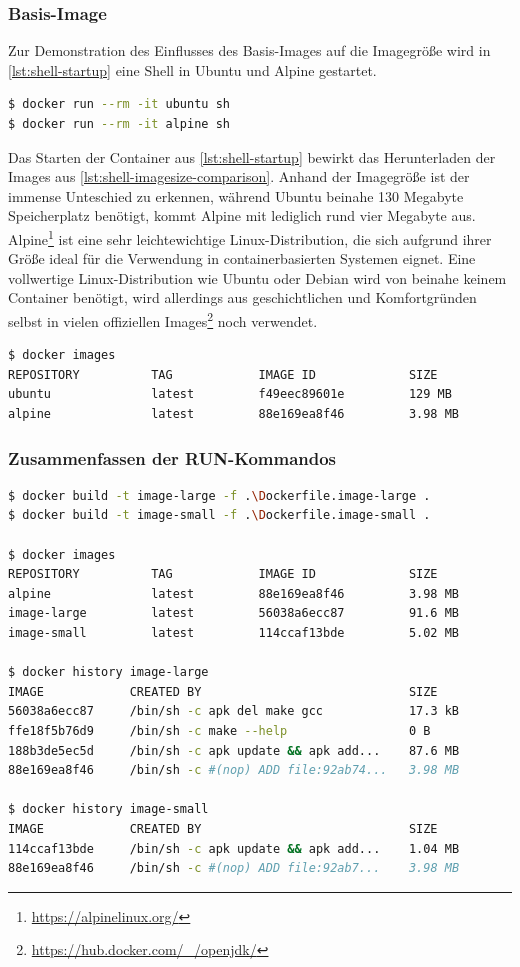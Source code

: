 \subsubsection{Basis-Image}
Zur Demonstration des Einflusses des Basis-Images auf die Imagegröße wird in \cref{lst:shell-startup} eine Shell in Ubuntu und Alpine gestartet.
\begin{lstlisting}[caption=Starten einer Shell in unterschiedlichen Basis-Images, language=bash, label=lst:shell-startup]
$ docker run --rm -it ubuntu sh
$ docker run --rm -it alpine sh
\end{lstlisting}

Das Starten der Container aus \cref{lst:shell-startup} bewirkt das Herunterladen der Images aus \cref{lst:shell-imagesize-comparison}. Anhand der Imagegröße ist der immense Unteschied zu erkennen, während Ubuntu beinahe 130 Megabyte Speicherplatz benötigt, kommt Alpine mit lediglich rund vier Megabyte aus.
Alpine\footnote{\url{https://alpinelinux.org/}} ist eine sehr leichtewichtige Linux-Distribution, die sich aufgrund ihrer Größe ideal für die Verwendung in containerbasierten Systemen eignet.
Eine vollwertige Linux-Distribution wie Ubuntu oder Debian wird von beinahe keinem Container benötigt, wird allerdings aus geschichtlichen und Komfortgründen selbst in vielen offiziellen Images\footnote{\url{https://hub.docker.com/_/openjdk/}} noch verwendet.
\begin{lstlisting}[caption=Vergleich der Basis-Imagegröße, language=bash, label=lst:shell-imagesize-comparison]
$ docker images
REPOSITORY          TAG            IMAGE ID             SIZE
ubuntu              latest         f49eec89601e         129 MB
alpine              latest         88e169ea8f46         3.98 MB
\end{lstlisting}

\subsubsection{Zusammenfassen der RUN-Kommandos}

\begin{lstlisting}[caption=Ubuntu-Bash in Docker, language=bash, label=lst:dockerfile-imagesize]
$ docker build -t image-large -f .\Dockerfile.image-large .
$ docker build -t image-small -f .\Dockerfile.image-small .

$ docker images
REPOSITORY          TAG            IMAGE ID             SIZE
alpine              latest         88e169ea8f46         3.98 MB
image-large         latest         56038a6ecc87         91.6 MB
image-small         latest         114ccaf13bde         5.02 MB

$ docker history image-large
IMAGE            CREATED BY                             SIZE
56038a6ecc87     /bin/sh -c apk del make gcc            17.3 kB
ffe18f5b76d9     /bin/sh -c make --help                 0 B
188b3de5ec5d     /bin/sh -c apk update && apk add...    87.6 MB
88e169ea8f46     /bin/sh -c #(nop) ADD file:92ab74...   3.98 MB

$ docker history image-small
IMAGE            CREATED BY                             SIZE
114ccaf13bde     /bin/sh -c apk update && apk add...    1.04 MB
88e169ea8f46     /bin/sh -c #(nop) ADD file:92ab7...    3.98 MB
\end{lstlisting}
